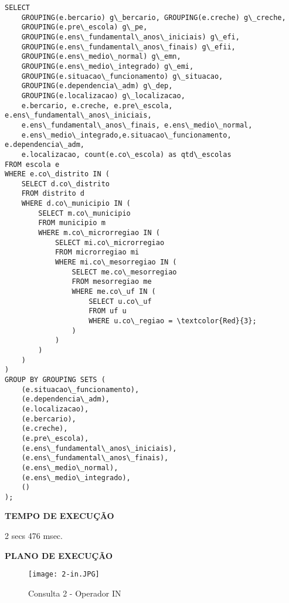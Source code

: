 \documentclass[12pt,a4paper]{article}
\begin{document}
\begin{Verbatim}[commandchars=\\\{\}]
SELECT
    GROUPING(e.bercario) g\_bercario, GROUPING(e.creche) g\_creche, 
    GROUPING(e.pre\_escola) g\_pe,
    GROUPING(e.ens\_fundamental\_anos\_iniciais) g\_efi,
    GROUPING(e.ens\_fundamental\_anos\_finais) g\_efii, 
    GROUPING(e.ens\_medio\_normal) g\_emn,
    GROUPING(e.ens\_medio\_integrado) g\_emi, 
    GROUPING(e.situacao\_funcionamento) g\_situacao,
    GROUPING(e.dependencia\_adm) g\_dep, 
    GROUPING(e.localizacao) g\_localizacao,
    e.bercario, e.creche, e.pre\_escola, e.ens\_fundamental\_anos\_iniciais,
    e.ens\_fundamental\_anos\_finais, e.ens\_medio\_normal,
    e.ens\_medio\_integrado,e.situacao\_funcionamento, e.dependencia\_adm, 
    e.localizacao, count(e.co\_escola) as qtd\_escolas
FROM escola e
WHERE e.co\_distrito IN (
    SELECT d.co\_distrito
    FROM distrito d
    WHERE d.co\_municipio IN (
        SELECT m.co\_municipio
        FROM municipio m
        WHERE m.co\_microrregiao IN (
            SELECT mi.co\_microrregiao
            FROM microrregiao mi
            WHERE mi.co\_mesorregiao IN (
                SELECT me.co\_mesorregiao
                FROM mesorregiao me
                WHERE me.co\_uf IN (
                    SELECT u.co\_uf
                    FROM uf u
                    WHERE u.co\_regiao = \textcolor{Red}{3};
                )
            )
        )
    )
)
GROUP BY GROUPING SETS (
    (e.situacao\_funcionamento),
    (e.dependencia\_adm),
    (e.localizacao),
    (e.bercario),
    (e.creche),
    (e.pre\_escola),
    (e.ens\_fundamental\_anos\_iniciais),
    (e.ens\_fundamental\_anos\_finais),
    (e.ens\_medio\_normal),
    (e.ens\_medio\_integrado),
    ()
);
\end{Verbatim}

\begin{flushleft}
\textbf{TEMPO DE EXECUÇÃO}\\
\end{flushleft}
2 secs 476 msec.\\

\begin{flushleft}
\textbf{PLANO DE EXECUÇÃO}\\
\end{flushleft}

\begin{figure}[H]
    \centering
    \texttt{[image: 2-in.JPG]}
    \caption{Consulta 2 - Operador IN}
    \label{fig:diagrama}
\end{figure}
\end{document}

